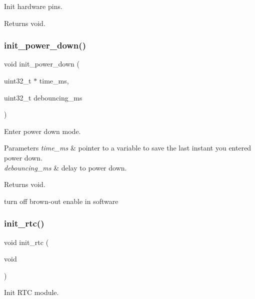 Init hardware pins. 

\begin{DoxyReturn}{Returns}
void. 
\end{DoxyReturn}
\mbox{\label{rmap_8ino_afb98a0f07c30784284f48271ffe02b97}} 
\subsubsection{\texorpdfstring{init\+\_\+power\+\_\+down()}{init\_power\_down()}}
{\footnotesize\ttfamily void init\+\_\+power\+\_\+down (\begin{DoxyParamCaption}\item[{uint32\+\_\+t $\ast$}]{time\+\_\+ms,  }\item[{uint32\+\_\+t}]{debouncing\+\_\+ms }\end{DoxyParamCaption})}



Enter power down mode. 


\begin{DoxyParams}{Parameters}
{\em time\+\_\+ms} & pointer to a variable to save the last instant you entered power down. \\
\hline
{\em debouncing\+\_\+ms} & delay to power down. \\
\hline
\end{DoxyParams}
\begin{DoxyReturn}{Returns}
void. 
\end{DoxyReturn}
turn off brown-\/out enable in software \mbox{\label{rmap_8ino_ab985cc69f5f573113405b4f118c96d33}} 
\subsubsection{\texorpdfstring{init\+\_\+rtc()}{init\_rtc()}}
{\footnotesize\ttfamily void init\+\_\+rtc (\begin{DoxyParamCaption}\item[{void}]{ }\end{DoxyParamCaption})}



Init R\+TC module. 

